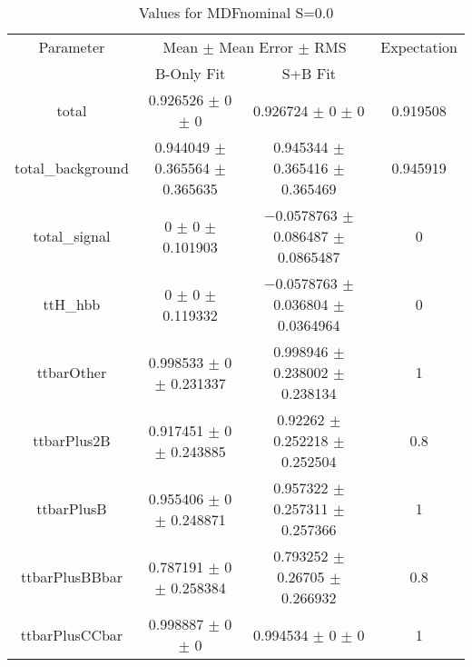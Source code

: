 \begin{table}
\centering
\caption{Values for MDFnominal S=0.0}
\begin{tabular}{cccc}
\toprule
Parameter & \multicolumn{2}{c}{Mean $\pm$ Mean Error $\pm$ RMS} & Expectation\\
 & B-Only Fit & S+B Fit & \\
\midrule
total & \num{0.926526} $\pm$ \num{0} $\pm$ \num{0} & \num{0.926724} $\pm$ \num{0} $\pm$ \num{0} & \num{0.919508}\\
total\_background & \num{0.944049} $\pm$ \num{0.365564} $\pm$ \num{0.365635} & \num{0.945344} $\pm$ \num{0.365416} $\pm$ \num{0.365469} & \num{0.945919}\\
total\_signal & \num{0} $\pm$ \num{0} $\pm$ \num{0.101903} & \num{-0.0578763} $\pm$ \num{0.086487} $\pm$ \num{0.0865487} & \num{0}\\
ttH\_hbb & \num{0} $\pm$ \num{0} $\pm$ \num{0.119332} & \num{-0.0578763} $\pm$ \num{0.036804} $\pm$ \num{0.0364964} & \num{0}\\
ttbarOther & \num{0.998533} $\pm$ \num{0} $\pm$ \num{0.231337} & \num{0.998946} $\pm$ \num{0.238002} $\pm$ \num{0.238134} & \num{1}\\
ttbarPlus2B & \num{0.917451} $\pm$ \num{0} $\pm$ \num{0.243885} & \num{0.92262} $\pm$ \num{0.252218} $\pm$ \num{0.252504} & \num{0.8}\\
ttbarPlusB & \num{0.955406} $\pm$ \num{0} $\pm$ \num{0.248871} & \num{0.957322} $\pm$ \num{0.257311} $\pm$ \num{0.257366} & \num{1}\\
ttbarPlusBBbar & \num{0.787191} $\pm$ \num{0} $\pm$ \num{0.258384} & \num{0.793252} $\pm$ \num{0.26705} $\pm$ \num{0.266932} & \num{0.8}\\
ttbarPlusCCbar & \num{0.998887} $\pm$ \num{0} $\pm$ \num{0} & \num{0.994534} $\pm$ \num{0} $\pm$ \num{0} & \num{1}\\
\bottomrule
\end{tabular}
\end{table}